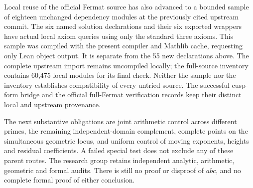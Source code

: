Local reuse of the official Fermat source has also advanced to a bounded
sample of eighteen unchanged dependency modules at the previously cited
upstream commit. The six named solution declarations and their six
exported wrappers have actual local axiom queries using only the standard
three axioms. This sample was compiled with the present compiler and
Mathlib cache, requesting only Lean object output. It is separate from
the 55 new declarations above. The complete upstream import remains
uncompiled locally; the full-source inventory contains 60,475 local
modules for its final check. Neither the sample nor the inventory
establishes compatibility of every untried source. The successful cusp-form
bridge and the official full-Fermat verification records keep their
distinct local and upstream provenance.

The next substantive obligations are joint arithmetic control across
different primes, the remaining independent-domain complement, complete
points on the simultaneous geometric locus, and uniform control of
moving exponents, heights and residual coefficients. A failed special
test does not exclude any of these parent routes. The research group
retains independent analytic, arithmetic, geometric and formal audits.
There is still no proof or disproof of $abc$, and no complete formal
proof of either conclusion.
